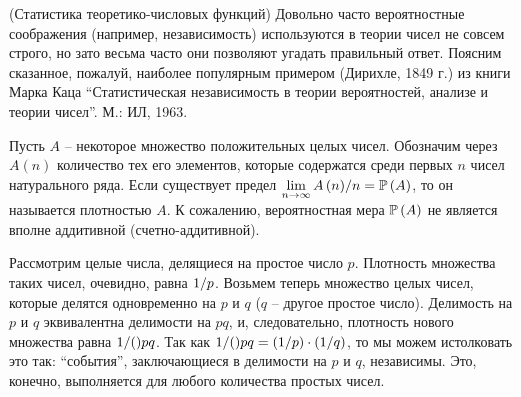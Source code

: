 \begin{problem}\Star(Статистика теоретико-числовых функций)
\label{sec:z_func_riman}
Довольно часто 
вероятностные соображения (например, независимость) используются в теории 
чисел не совсем строго, но зато весьма часто они позволяют угадать 
правильный ответ. Поясним сказанное, пожалуй, наиболее популярным примером (Дирихле, 1849 г.) 
из книги  Марка Каца 
``Статистическая независимость в теории вероятностей, анализе и теории 
чисел''. М.: ИЛ, 1963.

Пусть $A$ -- некоторое множество положительных целых чисел. Обозначим через 
$A\left( n \right)$ количество тех его элементов, которые содержатся среди 
первых $n$ чисел натурального ряда. Если существует предел $\mathop {\lim 
}\limits_{n\to \infty } {A\left( n \right)} \mathord{\left/ {\vphantom 
{{A\left( n \right)} n}} \right. \kern-\nulldelimiterspace} n=\PR\left( A 
\right)$, то он называется плотностью $A$. К сожалению, вероятностная мера 
$\mathrm{{\mathbb P}}\left( A \right)$ не является вполне аддитивной (счетно-аддитивной).

Рассмотрим целые числа, делящиеся на простое число $p$. Плотность множества 
таких чисел, очевидно, равна $1 \mathord{\left/ {\vphantom {1 p}} \right. 
\kern-\nulldelimiterspace} p$. Возьмем теперь множество целых чисел, которые 
делятся одновременно на $p$ и $q$ ($q$ -- другое простое число). Делимость 
на $p$ и $q$ эквивалентна делимости на $pq$, и, следовательно, плотность 
нового множества равна $1 \mathord{\left/ ({\vphantom {1 {pq}}}) \right. 
\kern-\nulldelimiterspace} {pq}$. Так как $1 \mathord{\left/ ({\vphantom {1 
{pq}}}) \right. \kern-\nulldelimiterspace} {pq}=\left( {1 \mathord{\left/ 
{\vphantom {1 p}} \right. \kern-\nulldelimiterspace} p} \right)\cdot \left( 
{1 \mathord{\left/ {\vphantom {1 q}} \right. \kern-\nulldelimiterspace} q} 
\right)$, то мы можем истолковать это так: ``события'', заключающиеся в 
делимости на $p$ и $q$, независимы. Это, конечно, выполняется для любого 
количества простых чисел.


\end{problem}
